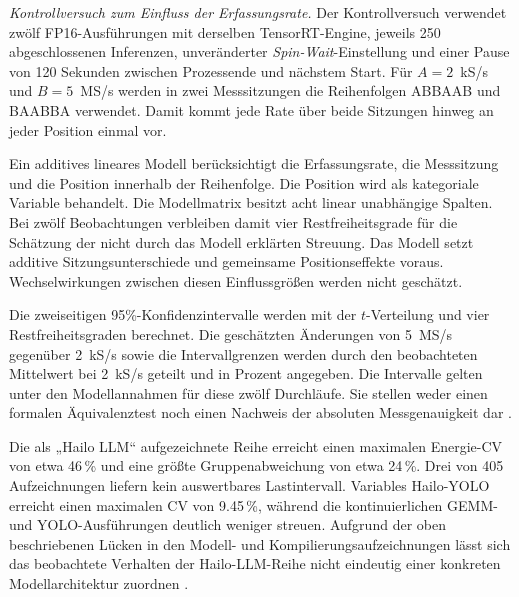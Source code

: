 \begin{table}[!htb]
\centering\small\TableSetup
\caption[Streuung innerhalb einer Erfassungsrate und Unterschiede zwischen den Raten.]{Größter Variationskoeffizient der Energie innerhalb einer Erfassungsrate und größte absolute relative Abweichung eines Ratengruppenmittelwerts vom gleichgewichteten Mittel aller Ratengruppen. Die Anzahl der Durchläufe umfasst nur Aufzeichnungen mit einem auswertbaren Lastintervall \cite{edgeAIResults2026}.}
\label{tab:energy:direct_rates}

\end{table}

\emph{Kontrollversuch zum Einfluss der Erfassungsrate.} Der Kontrollversuch verwendet zwölf FP16-Ausführungen mit derselben TensorRT-Engine, jeweils 250 abgeschlossenen Inferenzen, unveränderter \emph{Spin-Wait}-Einstellung und einer Pause von 120 Sekunden zwischen Prozessende und nächstem Start. Für $A=2$~kS/s und $B=5$~MS/s werden in zwei Messsitzungen die Reihenfolgen ABBAAB und BAABBA verwendet. Damit kommt jede Rate über beide Sitzungen hinweg an jeder Position einmal vor.

Ein additives lineares Modell berücksichtigt die Erfassungsrate, die Messsitzung und die Position innerhalb der Reihenfolge. Die Position wird als kategoriale Variable behandelt. Die Modellmatrix besitzt acht linear unabhängige Spalten. Bei zwölf Beobachtungen verbleiben damit vier Restfreiheitsgrade für die Schätzung der nicht durch das Modell erklärten Streuung. Das Modell setzt additive Sitzungsunterschiede und gemeinsame Positionseffekte voraus. Wechselwirkungen zwischen diesen Einflussgrößen werden nicht geschätzt.

Die zweiseitigen 95\%-Konfidenzintervalle werden mit der $t$-Verteilung und vier Restfreiheitsgraden berechnet. Die geschätzten Änderungen von 5~MS/s gegenüber 2~kS/s sowie die Intervallgrenzen werden durch den beobachteten Mittelwert bei 2~kS/s geteilt und in Prozent angegeben. Die Intervalle gelten unter den Modellannahmen für diese zwölf Durchläufe. Sie stellen weder einen formalen Äquivalenztest noch einen Nachweis der absoluten Messgenauigkeit dar \cite{mika2026timEnergy,energyEvidence2026}.

Die als „Hailo LLM“ aufgezeichnete Reihe erreicht einen maximalen Energie-CV von etwa 46\,\% und eine größte Gruppenabweichung von etwa 24\,\%. Drei von 405 Aufzeichnungen liefern kein auswertbares Lastintervall. Variables Hailo-YOLO erreicht einen maximalen CV von \num{9.45}\,\%, während die kontinuierlichen GEMM- und YOLO-Ausführungen deutlich weniger streuen. Aufgrund der oben beschriebenen Lücken in den Modell- und Kompilierungsaufzeichnungen lässt sich das beobachtete Verhalten der Hailo-LLM-Reihe nicht eindeutig einer konkreten Modellarchitektur zuordnen \cite{energyEvidence2026,edgeAIResults2026}.

